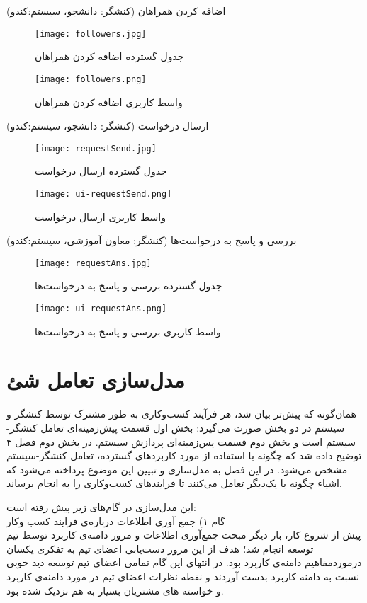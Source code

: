 \documentclass{report}
\begin{document}
\pagebreak
\clearpage
\textbf{}
اضافه کردن همراهان (کنشگر: دانشجو، سیستم:کندو)
\begin{figure}[!htb]
\centering
\texttt{[image: followers.jpg]}
\caption{جدول گسترده‌ اضافه کردن همراهان}
\end{figure}
\begin{figure}[!htb]
\centering
\texttt{[image: followers.png]}
\caption{واسط کاربری اضافه کردن همراهان}
\end{figure}
\pagebreak
\clearpage
{}
ارسال درخواست (کنشگر: دانشجو، ﺳﯿﺴﺘﻢ:ﮐﻨﺪﻭ)
\begin{figure}[!htb]
\centering
\texttt{[image: requestSend.jpg]}
\caption{جدول گسترده‌ ارسال درخواست}
\end{figure} 
\begin{figure}[!htb]
\centering
\texttt{[image: ui-requestSend.png]}
\caption{واسط کاربری ارسال درخواست}
\end{figure} 
\pagebreak
\clearpage
\restoregeometry
\textbf{}
بررسی و پاسخ به درخواست‌ها (کنشگر: معاون آموزشی، سیستم:کندو)
\begin{figure}[!htb]
\centering
\texttt{[image: requestAns.jpg]}
\caption{جدول گسترده‌ بررسی و پاسخ به درخواست‌ها}
\end{figure}
\begin{figure}[!htb]
\centering
\texttt{[image: ui-requestAns.png]}
\caption{واسط کاربری بررسی و پاسخ به درخواست‌ها}
\end{figure}
\pagebreak
\clearpage

\chapter{مدل‌سازی تعامل شئ}
همان‌گونه که پیش‌تر بیان شد، هر فرآیند کسب‌وکاری به طور مشترک توسط کنشگر و سیستم در دو بخش صورت می‌گیرد: بخش اول قسمت پیش‌زمینه‌ای تعامل کنشگر-سیستم است و بخش دوم قسمت پس‌زمینه‌ای پردازش سیستم. در
\hyperlink{ch4}{ بخش دوم فصل ۴}
 توضیح داده شد که چگونه با استفاده از مورد کاربردهای گسترده، تعامل کنشگر-سیستم مشخص می‌شود. در این فصل به مدل‌سازی و تبیین این موضوع پرداخته می‌شود که اشیاء چگونه با یک‌دیگر تعامل می‌کنند تا فرایندهای کسب‌وکاری را به انجام برساند.

این مدل‌سازی در گام‌های زیر پیش رفته است:\\
گام ۱) جمع آوری اطلاعات درباره‌ی فرایند کسب وکار\\
پیش از شروع کار، بار دیگر مبحث جمع‌آوری اطلاعات و مرور دامنه‌ی کاربرد توسط تیم توسعه انجام شد؛  هدف از این مرور دست‌یابی اعضای تیم به تفکری یکسان درموردمفاهیم دامنه‌ی کاربرد بود. در انتهای این گام تمامی اعضای تیم توسعه دید خوبی نسبت به دامنه کاربرد بدست آوردند و نقطه نظرات اعضای تیم در مورد دامنه‌ی کاربرد و خواسته های مشتریان بسیار به هم نزدیک شده بود.
\end{document}
